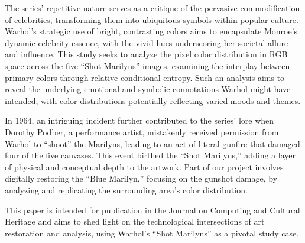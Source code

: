 \documentclass{article}
\begin{document}
The series' repetitive nature serves as a critique of the pervasive
commodification of celebrities, transforming them into ubiquitous
symbols within popular culture. Warhol's strategic use of bright,
contrasting colors aims to encapsulate Monroe's dynamic celebrity
essence, with the vivid hues underscoring her societal allure and
influence. This study seeks to analyze the pixel color distribution in
RGB space across the five ``Shot Marilyns'' images, examining the
interplay between primary colors through relative conditional entropy.
Such an analysis aims to reveal the underlying emotional and symbolic
connotations Warhol might have intended, with color distributions
potentially reflecting varied moods and themes.

In 1964, an intriguing incident further contributed to the series' lore
when Dorothy Podber, a performance artist, mistakenly received
permission from Warhol to ``shoot'' the Marilyns, leading to an act of
literal gunfire that damaged four of the five canvases. This event
birthed the ``Shot Marilyns,'' adding a layer of physical and conceptual
depth to the artwork. Part of our project involves digitally restoring
the ``Blue Marilyn,'' focusing on the gunshot damage, by analyzing and
replicating the surrounding area's color distribution.

This paper is intended for publication in the Journal on Computing and
Cultural Heritage and aims to shed light on the technological
intersections of art restoration and analysis, using Warhol's ``Shot
Marilyns'' as a pivotal study case.
\end{document}
